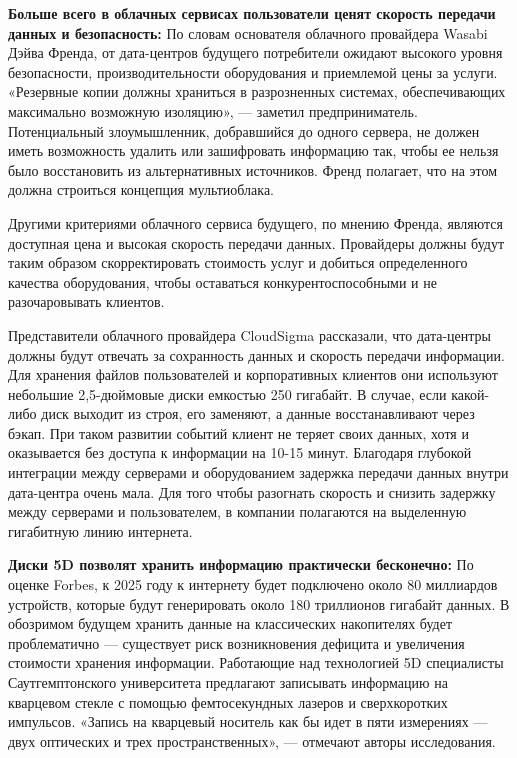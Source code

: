 \textbf{Больше всего в облачных сервисах пользователи ценят скорость передачи данных и безопасность:} По словам основателя облачного провайдера Wasabi Дэйва Френда, от дата-центров будущего потребители ожидают высокого уровня безопасности, производительности оборудования и приемлемой цены за услуги. «Резервные копии должны храниться в разрозненных системах, обеспечивающих максимально возможную изоляцию», — заметил предприниматель. Потенциальный злоумышленник, добравшийся до одного сервера, не должен иметь возможность удалить или зашифровать информацию так, чтобы ее нельзя было восстановить из альтернативных источников. Френд полагает, что на этом должна строиться концепция мультиоблака.

Другими критериями облачного сервиса будущего, по мнению Френда, являются доступная цена и высокая скорость передачи данных. Провайдеры должны будут таким образом скорректировать стоимость услуг и добиться определенного качества оборудования, чтобы оставаться конкурентоспособными и не разочаровывать клиентов.

Представители облачного провайдера CloudSigma рассказали, что дата-центры должны будут отвечать за сохранность данных и скорость передачи информации. Для хранения файлов пользователей и корпоративных клиентов они используют небольшие 2,5-дюймовые диски емкостью 250 гигабайт. В случае, если какой-либо диск выходит из строя, его заменяют, а данные восстанавливают через бэкап. При таком развитии событий клиент не теряет своих данных, хотя и оказывается без доступа к информации на 10-15 минут. Благодаря глубокой интеграции между серверами и оборудованием задержка передачи данных внутри дата-центра очень мала. Для того чтобы разогнать скорость и снизить задержку между серверами и пользователем, в компании полагаются на выделенную гигабитную линию интернета.


\textbf{Диски 5D позволят хранить информацию практически бесконечно:}
По оценке Forbes, к 2025 году к интернету будет подключено около 80 миллиардов устройств, которые будут генерировать около 180 триллионов гигабайт данных. В обозримом будущем хранить данные на классических накопителях будет проблематично — существует риск возникновения дефицита и увеличения стоимости хранения информации. Работающие над технологией 5D специалисты Саутгемптонского университета предлагают записывать информацию на кварцевом стекле с помощью фемтосекундных лазеров и сверхкоротких импульсов. «Запись на кварцевый носитель как бы идет в пяти измерениях — двух оптических и трех пространственных», — отмечают авторы исследования.

